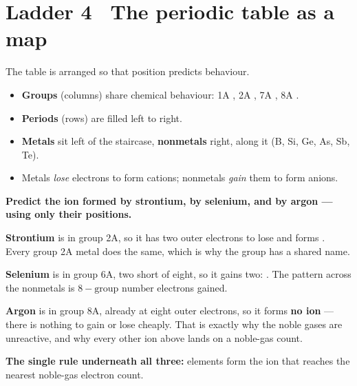 \documentclass{apchem-worksheet}
\begin{document}
\section*{\sffamily Ladder 4 \textbullet\ The periodic table as a map}

The table is arranged so that position predicts behaviour.

\begin{itemize}[leftmargin=*,itemsep=0.15em]
  \item \textbf{Groups} (columns) share chemical behaviour: 1A
        , 2A , 7A
        , 8A .
  \item \textbf{Periods} (rows) are filled left to right.
  \item \textbf{Metals} sit left of the staircase, \textbf{nonmetals}
        right,  along it (B, Si, Ge, As, Sb, Te).
  \item Metals \emph{lose} electrons to form cations; nonmetals
        \emph{gain} them to form anions.
\end{itemize}

\begin{workedexample}
\textbf{Predict the ion formed by strontium, by selenium, and by argon
--- using only their positions.}

\textbf{Strontium} is in group 2A, so it has two outer electrons to lose
and forms \textbf{}. Every group 2A metal does the same, which
is why the group has a shared name.

\textbf{Selenium} is in group 6A, two short of eight, so it gains two:
\textbf{}. The pattern across the nonmetals is
$8 - \text{group number}$ electrons gained.

\textbf{Argon} is in group 8A, already at eight outer electrons, so it
forms \textbf{no ion} --- there is nothing to gain or lose cheaply. That
is exactly why the noble gases are unreactive, and why every other ion
above lands on a noble-gas count.

\textbf{The single rule underneath all three:} elements form the ion that
reaches the nearest noble-gas electron count.
\end{workedexample}
\end{document}
